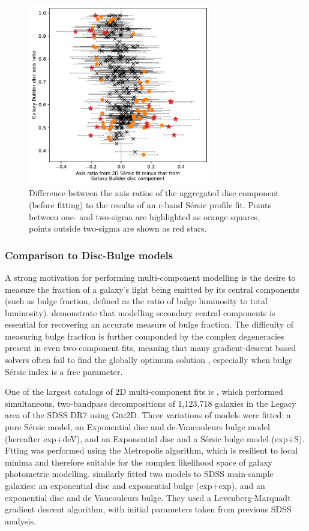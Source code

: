 \documentclass[../main.tex]{subfiles}
\begin{document}
\begin{figure}
  \includegraphics[width=8cm]{images__results/gzb-agg-nsa-comparison.pdf}
  \caption{Difference between the axis ratios of the aggregated disc component (before fitting) to the results of an r-band S\'ersic profile fit. Points  between one- and two-sigma are highlighted as orange squares, points outside two-sigma are shown as red stars.}
  \label{fig:ax_ratio_comparison}
\end{figure}


\subsubsection{Comparison to Disc-Bulge models}

A strong motivation for performing multi-component modelling is the desire to measure the fraction of a galaxy's light being emitted by its central components (such as bulge fraction, defined as the ratio of bulge luminosity to total luminosity). \citet{Gao2017:1709.00746v1} demonstrate that modelling secondary central components is essential for recovering an accurate measure of bulge fraction. The difficulty of measuring bulge fraction is further componded by the complex degeneracies present in even two-component fits, meaning that many gradient-descent based solvers often fail to find the globally optimum solution , especially when bulge S\'ersic index is a free parameter.

One of the largest catalogs of 2D multi-component fits is \citet{2011ApJS..196...11S}, which performed simultaneous, two-bandpass decompositions of 1,123,718 galaxies in the Legacy area of the SDSS DR7 using \textsc{Gim2D}. Three variations of models were fitted: a pure S\'ersic model, an Exponential disc and de-Vaucouleurs bulge model (hereafter exp+deV), and an Exponential disc and a S\'ersic bulge model (exp+S). Ftting was performed using the Metropolis algorithm, which is resilient to local minima and therefore suitable for the complex likelihood space of galaxy photometric modelling. \citet{2012MNRAS.421.2277L} similarly fitted two models to SDSS main-sample galaxies: an exponential disc and exponential bulge (exp+exp), and an exponential disc and de Vaucouleurs bulge. They used a Levenberg-Marquadt gradient descent algorithm, with initial parameters taken from previous SDSS analysis.
\end{document}
